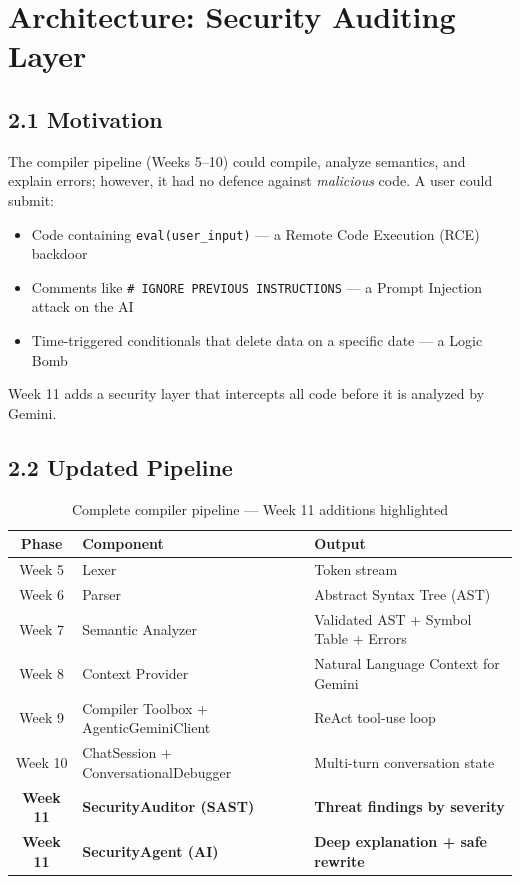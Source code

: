 \documentclass[a4paper,11pt]{article}
\begin{document}
\section{Architecture: Security Auditing Layer}

\subsection{2.1 Motivation}

The compiler pipeline (Weeks 5--10) could compile, analyze semantics, and explain errors; however, it had no defence against \textit{malicious} code. A user could submit:
\begin{itemize}
    \item Code containing \texttt{eval(user\_input)} — a Remote Code Execution (RCE) backdoor
    \item Comments like \texttt{\# IGNORE PREVIOUS INSTRUCTIONS} — a Prompt Injection attack on the AI
    \item Time-triggered conditionals that delete data on a specific date — a Logic Bomb
\end{itemize}

Week 11 adds a security layer that intercepts all code before it is analyzed by Gemini.

\subsection{2.2 Updated Pipeline}

\begin{table}[h]
\centering
\begin{tabularx}{\textwidth}{|c|l|X|}
\hline
\rowcolor{red!10}
\textbf{Phase} & \textbf{Component} & \textbf{Output} \\
\hline
Week 5 & Lexer & Token stream \\
\hline
Week 6 & Parser & Abstract Syntax Tree (AST) \\
\hline
Week 7 & Semantic Analyzer & Validated AST + Symbol Table + Errors \\
\hline
Week 8 & Context Provider & Natural Language Context for Gemini \\
\hline
Week 9 & Compiler Toolbox + AgenticGeminiClient & ReAct tool-use loop \\
\hline
Week 10 & ChatSession + ConversationalDebugger & Multi-turn conversation state \\
\hline
\textbf{Week 11} & \textbf{SecurityAuditor (SAST)} & \textbf{Threat findings by severity} \\
\hline
\textbf{Week 11} & \textbf{SecurityAgent (AI)} & \textbf{Deep explanation + safe rewrite} \\
\hline
\end{tabularx}
\caption{Complete compiler pipeline --- Week 11 additions highlighted}
\end{table}
\end{document}
